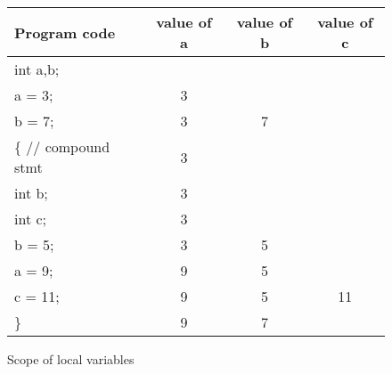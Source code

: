 




\begin {figure}

\begin {tabular} {l c c c}
Program code    	&  value of a	&  value of b 	& value of c \\
\hline
int a,b;		&		&	&		\\
a = 3;			&  3 		&	&		\\
b = 7;			&  3 		&  7	&		\\
\{    // compound stmt	&  3 		&	&		\\
  int b;		&  3		&	&		\\
  int c;		&  3		&	&		\\
  b = 5;		&  3		&  5	&		\\
  a = 9;		&  9		&  5	&		\\
  c = 11;		&  9		&  5	&  11		\\
\}
			&  9		&  7		\\
\end {tabular}
 	


\caption {Scope of local variables}

\label {fig:scope}

\end {figure}


